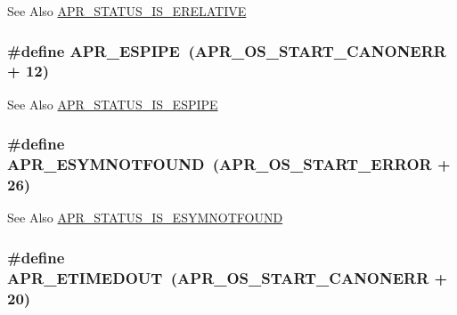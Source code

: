 \begin{DoxySeeAlso}{See Also}
\hyperlink{group___a_p_r___s_t_a_t_u_s___i_s_ga7a8fca5102890e9a0bc4133ba848d52c}{A\-P\-R\-\_\-\-S\-T\-A\-T\-U\-S\-\_\-\-I\-S\-\_\-\-E\-R\-E\-L\-A\-T\-I\-V\-E} 
\end{DoxySeeAlso}
\hypertarget{group___a_p_r___error_ga3be81035cd2da76fbc27c75496489359}{
\subsubsection[{A\-P\-R\-\_\-\-E\-S\-P\-I\-P\-E}]{\setlength{\rightskip}{0pt plus 5cm}\#define A\-P\-R\-\_\-\-E\-S\-P\-I\-P\-E~({\bf A\-P\-R\-\_\-\-O\-S\-\_\-\-S\-T\-A\-R\-T\-\_\-\-C\-A\-N\-O\-N\-E\-R\-R} + 12)}}\label{group___a_p_r___error_ga3be81035cd2da76fbc27c75496489359}
\begin{DoxySeeAlso}{See Also}
\hyperlink{group___a_p_r___s_t_a_t_u_s___i_s_gac9b1e593377ac3b93b259f30f04a1185}{A\-P\-R\-\_\-\-S\-T\-A\-T\-U\-S\-\_\-\-I\-S\-\_\-\-E\-S\-P\-I\-P\-E} 
\end{DoxySeeAlso}
\hypertarget{group___a_p_r___error_ga8d96410fc32408160e1e85e2e96402fa}{
\subsubsection[{A\-P\-R\-\_\-\-E\-S\-Y\-M\-N\-O\-T\-F\-O\-U\-N\-D}]{\setlength{\rightskip}{0pt plus 5cm}\#define A\-P\-R\-\_\-\-E\-S\-Y\-M\-N\-O\-T\-F\-O\-U\-N\-D~({\bf A\-P\-R\-\_\-\-O\-S\-\_\-\-S\-T\-A\-R\-T\-\_\-\-E\-R\-R\-O\-R} + 26)}}\label{group___a_p_r___error_ga8d96410fc32408160e1e85e2e96402fa}
\begin{DoxySeeAlso}{See Also}
\hyperlink{group___a_p_r___s_t_a_t_u_s___i_s_gafab6c5fe2f9b906d533d253097a16e09}{A\-P\-R\-\_\-\-S\-T\-A\-T\-U\-S\-\_\-\-I\-S\-\_\-\-E\-S\-Y\-M\-N\-O\-T\-F\-O\-U\-N\-D} 
\end{DoxySeeAlso}
\hypertarget{group___a_p_r___error_ga6aeccbe9accb34f0adc1cb1ab9a82a8d}{
\subsubsection[{A\-P\-R\-\_\-\-E\-T\-I\-M\-E\-D\-O\-U\-T}]{\setlength{\rightskip}{0pt plus 5cm}\#define A\-P\-R\-\_\-\-E\-T\-I\-M\-E\-D\-O\-U\-T~({\bf A\-P\-R\-\_\-\-O\-S\-\_\-\-S\-T\-A\-R\-T\-\_\-\-C\-A\-N\-O\-N\-E\-R\-R} + 20)}}\label{group___a_p_r___error_ga6aeccbe9accb34f0adc1cb1ab9a82a8d}
